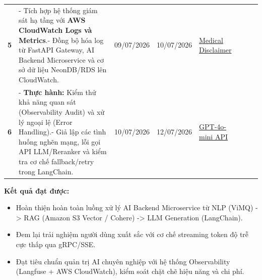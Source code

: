 \begin{longtable}[]
{Warnings} \\
\textbf{5} & - Tích hợp hệ thống giám sát hạ tầng với \textbf{AWS
CloudWatch Logs và Metrics}.- Đồng bộ hóa log từ FastAPI Gateway, AI
Backend Microservice và cơ sở dữ liệu NeonDB/RDS lên CloudWatch. &
09/07/2026 & 10/07/2026 &
\href{https://en.wikipedia.org/wiki/Medical_disclaimer}{Medical
Disclaimer} \\
\textbf{6} & - \textbf{Thực hành:} Kiểm thử khả năng quan sát
(Observability Audit) và xử lý ngoại lệ (Error Handling).- Giả lập các
tình huống nghẽn mạng, lỗi gọi API LLM/Reranker và kiểm tra cơ chế
fallback/retry trong LangChain. & 10/07/2026 & 12/07/2026 &
\href{https://platform.openai.com/docs/models/gpt-4o-mini}{GPT-4o-mini
API} \\
\end{longtable}
\endgroup

\vspace{0.5em}\noindent\textbf{Kết quả đạt được:}

\begin{itemize}
\tightlist
\item
  Hoàn thiện hoàn toàn luồng xử lý AI Backend Microservice từ NLP (ViMQ)
  -\textgreater{} RAG (Amazon S3 Vector / Cohere) -\textgreater{} LLM
  Generation (LangChain).
\item
  Đem lại trải nghiệm người dùng xuất sắc với cơ chế streaming token độ
  trễ cực thấp qua gRPC/SSE.
\item
  Đạt tiêu chuẩn quản trị AI chuyên nghiệp với hệ thống Observability
  (Langfuse + AWS CloudWatch), kiểm soát chặt chẽ hiệu năng và chi phí.
\end{itemize}
